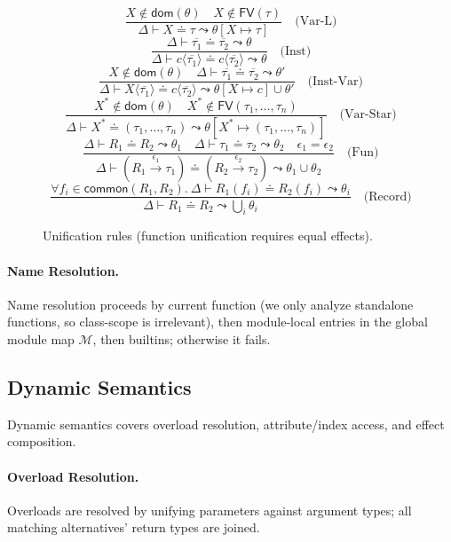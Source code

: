 \begin{figure*}[t]
\centering
\[
\frac{X \notin \mathsf{dom}(\theta) \quad X \notin \mathsf{FV}(\tau)}{\Delta \vdash X \doteq \tau \leadsto \theta[X \mapsto \tau]} \quad \text{(Var-L)}
\]
\[
\frac{\Delta \vdash \overline{\tau_1} \doteq \overline{\tau_2} \leadsto \theta}{\Delta \vdash c\langle\overline{\tau_1}\rangle \doteq c\langle\overline{\tau_2}\rangle \leadsto \theta} \quad \text{(Inst)}
\]
\[
\frac{X \notin \mathsf{dom}(\theta) \quad \Delta \vdash \overline{\tau_1} \doteq \overline{\tau_2} \leadsto \theta'}{\Delta \vdash X\langle\overline{\tau_1}\rangle \doteq c\langle\overline{\tau_2}\rangle \leadsto \theta[X \mapsto c] \cup \theta'} \quad \text{(Inst-Var)}
\]
\[
\frac{X^* \notin \mathsf{dom}(\theta) \quad X^* \notin \mathsf{FV}(\tau_1, \ldots, \tau_n)}{\Delta \vdash X^* \doteq (\tau_1, \ldots, \tau_n) \leadsto \theta[X^* \mapsto (\tau_1, \ldots, \tau_n)]} \quad \text{(Var-Star)}
\]
\[
\frac{\Delta \vdash R_1 \doteq R_2 \leadsto \theta_1 \quad \Delta \vdash \tau_1 \doteq \tau_2 \leadsto \theta_2 \quad \epsilon_1 = \epsilon_2}{\Delta \vdash (R_1 \xrightarrow{\epsilon_1} \tau_1) \doteq (R_2 \xrightarrow{\epsilon_2} \tau_2) \leadsto \theta_1 \cup \theta_2} \quad \text{(Fun)}
\]
\[
\frac{\forall f_i \in \mathsf{common}(R_1, R_2).\ \Delta \vdash R_1(f_i) \doteq R_2(f_i) \leadsto \theta_i}{\Delta \vdash R_1 \doteq R_2 \leadsto \bigcup_i \theta_i} \quad \text{(Record)}
\]
\caption{Unification rules (function unification requires equal effects).}
\label{fig:unification}
\end{figure*}

\paragraph{Name Resolution.}  
Name resolution proceeds by current function (we only analyze standalone functions, so class-scope is irrelevant), then module‐local entries in the global module map $\mathcal{M}$, then builtins; otherwise it fails.

\subsection{Dynamic Semantics}

Dynamic semantics covers overload resolution, attribute/index access, and effect composition.

\paragraph{Overload Resolution.}  
Overloads are resolved by unifying parameters against argument types; all matching alternatives’ return types are joined.

